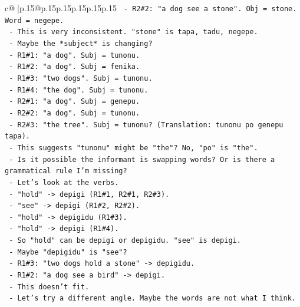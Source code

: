 \documentclass{article}
\begin{document}
{\begin{supertabular}{c@{$\;$}|p{.15\linewidth}@{}p{.15\linewidth}p{.15\linewidth}p{.15\linewidth}p{.15\linewidth}p{.15\linewidth}}
{{{\texttt{                  {-} R2\#2: "a dog see a stone". Obj = stone. Word = negepe.} \\
\texttt{                  {-} This is very inconsistent. "stone" is tapa, tadu, negepe.} \\
\texttt{                  {-} Maybe the *subject* is changing?} \\
\texttt{                  {-} R1\#1: "a dog". Subj = tunonu.} \\
\texttt{                  {-} R1\#2: "a dog". Subj = fenika.} \\
\texttt{                  {-} R1\#3: "two dogs". Subj = tunonu.} \\
\texttt{                  {-} R1\#4: "the dog". Subj = tunonu.} \\
\texttt{                  {-} R2\#1: "a dog". Subj = genepu.} \\
\texttt{                  {-} R2\#2: "a dog". Subj = tunonu.} \\
\texttt{                  {-} R2\#3: "the tree". Subj = tunonu? (Translation: tunonu po genepu tapa).} \\
\texttt{                  {-} This suggests "tunonu" might be "the"? No, "po" is "the".} \\
\texttt{                  {-} Is it possible the informant is swapping words? Or is there a grammatical rule I'm missing?} \\
\texttt{                  {-} Let's look at the verbs.} \\
\texttt{                    {-} "hold" {-}> depigi (R1\#1, R2\#1, R2\#3).} \\
\texttt{                    {-} "see" {-}> depigi (R1\#2, R2\#2).} \\
\texttt{                    {-} "hold" {-}> depigidu (R1\#3).} \\
\texttt{                    {-} "hold" {-}> depigi (R1\#4).} \\
\texttt{                    {-} So "hold" can be depigi or depigidu. "see" is depigi.} \\
\texttt{                    {-} Maybe "depigidu" is "see"?} \\
\texttt{                      {-} R1\#3: "two dogs hold a stone" {-}> depigidu.} \\
\texttt{                      {-} R1\#2: "a dog see a bird" {-}> depigi.} \\
\texttt{                      {-} This doesn't fit.} \\
\texttt{                  {-} Let's try a different angle. Maybe the words are not what I think.} \\
}}}
\end{supertabular}}
\end{document}
